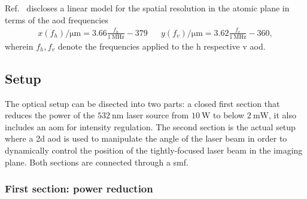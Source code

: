 Ref.~\cite{Hertlein2017}
discloses a linear model for the spatial resolution in the atomic plane in
terms of the \gls{aod} frequencies
\begin{align}
  x(f_h)/\si{\micro\meter}=3.66\frac{f_h}{\SI{1}{\mega\hertz}}-379 &&
  y(f_v)/\si{\micro\meter}=3.62\frac{f_v}{\SI{1}{\mega\hertz}}-360
  \label{eq:spatial_position_frequency},
\end{align}
wherein $f_h,f_v$ denote the frequencies applied to the \gls{h} respective
\gls{v} \gls{aod}.

\subsection{Setup}

The optical setup can be disected into two parts: a closed first section that
reduces the power of the $\SI{532}{\nano\meter}$ laser source from
$\SI{10}{\watt}$ to below $\SI{2}{\milli\watt}$, it also includes an \gls{aom}
for intensity regulation. The second section is the actual setup where a
\gls{2d} \gls{aod} is used to manipulate the angle of the laser beam in order
to dynamically control the position of the tightly-focused laser beam in the
imaging plane. Both sections are connected through a \gls{smf}.

\subsubsection{First section: power reduction}\label{subsec:setup_power_reduction}

